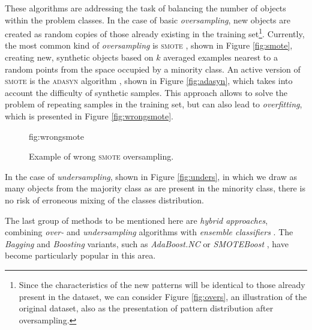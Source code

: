 \documentclass[pmlr]{jmlr}
\begin{document}
These algorithms are addressing the task of balancing the number of objects within the problem classes. In the case of basic \emph{oversampling}, new objects are created as random copies of those already existing in the training set\footnote{Since the characteristics of the new patterns will be identical to those already present in the dataset, we can consider Figure \ref{fig:overs}, an illustration of the original dataset, also as the presentation of pattern distribution after oversampling.}. Currently, the most common kind of \emph{oversampling}  is \textsc{smote} \citep{Cha2002}, shown in Figure \ref{fig:smote}, creating new, synthetic objects based on $k$ averaged examples nearest to a random points from the space occupied by a minority class. An active version of \textsc{smote} is the \textsc{adasyn} algorithm \citep{He:2008}, shown in Figure \ref{fig:adasyn}, which takes into account the difficulty of synthetic samples. This approach allows to solve the problem of repeating samples in the training set, but can also lead to \emph{overfitting}, which is presented in Figure \ref{fig:wrongsmote}.

\begin{figure}[htbp]
\floatconts
  {fig:wrongsmote}
  {\caption{Example of wrong \textsc{smote} oversampling.}}
  {%
    \qquad
  }
\end{figure}

In the case of \emph{undersampling}, shown in Figure \ref{fig:unders}, in which we draw as many objects from the majority class as are present in the minority class, there is no risk of erroneous mixing of the classes distribution.

The last group of methods to be mentioned here are \emph{hybrid approaches}, combining \emph{over-} and \emph{undersampling} algorithms with \emph{ensemble classifiers} \citep{Galar:2012}. The \emph{Bagging} and \emph{Boosting} variants, such as \emph{AdaBoost.NC} \citep{Wang:2010} or \emph {SMOTEBoost} \citep{Chawla:2003}, have become particularly popular in this area.
\end{document}
